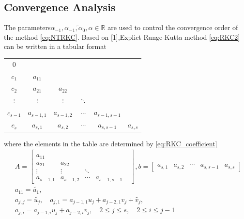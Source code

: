 \documentclass[review,fleqn]{elsarticle}
\begin{document}
\subsection{Convergence Analysis}
The parameters$ \alpha_{-1},\tilde{\alpha_{-1},\alpha_{0},\alpha} \in  \mathbb{R} $ are used to control the convergence order of the method \eqref{eq:NTRKC}.
Based on [1],Explict Runge-Kutta method \eqref{eq:RKC2} can be written in a tabular format

\begin{center}
\vspace{10pt} 
\begin{tabular}{c|c c c c c}

    
       0    &  &  &  &  &  \\
  
    $c_1$ & $a_{11}$ &  &  &  &  \\

    $c_2$ & $a_{21}$ & $a_{22}$ &  &  &  \\
 
    $\vdots$ & $\vdots$ & $\vdots$ & $\ddots$ &  &  \\
    
    $c_{s-1}$ & $a_{s-1,1}$ & $a_{s-1,2}$ &$\cdots$ & $a_{s-1,s-1}$ &   \\
    \hline
    $c_{s}$ & $a_{s,1}$ & $a_{s,2}$ &$\cdots$ & $a_{s,s-1}$ & $a_{s,s}$  \\
    
\end{tabular}
\vspace{10pt}
\end{center}
where the elements in the table are determined by \eqref{eq:RKC_coefficient}
\begin{equation}
    \begin{aligned}
       & A=\begin{bmatrix}
            &  &  &  & \\
            a_{11} &  &  & & \\
            a_{21} & a_{22} &  & & \\
            \vdots & \vdots & \ddots & & \\
            a_{s-1,1} & a_{s-1,2} & \cdots & a_{s-1,s-1}
        \end{bmatrix},
        b=\begin{bmatrix}
            a_{s,1} & a_{s,2}&\cdots & a_{s,s-1} & a_{s,s} 
        \end{bmatrix}\\
      & a_{11}=\tilde{u_1},\\
       & a_{j,j}=\tilde{u_{j}},\quad a_{j,1}=a_{j-1,1}u_{j}+a_{j-2,1}v_{j}+\tilde{v_j},\\
      &  a_{j,i}=a_{j-1,i}u_{j}+a_{j-2,i}v_{j},\quad 2 \le  j \le s, \quad 2 \le i  \le j-1 
    \end{aligned}
\end{equation}
\end{document}
